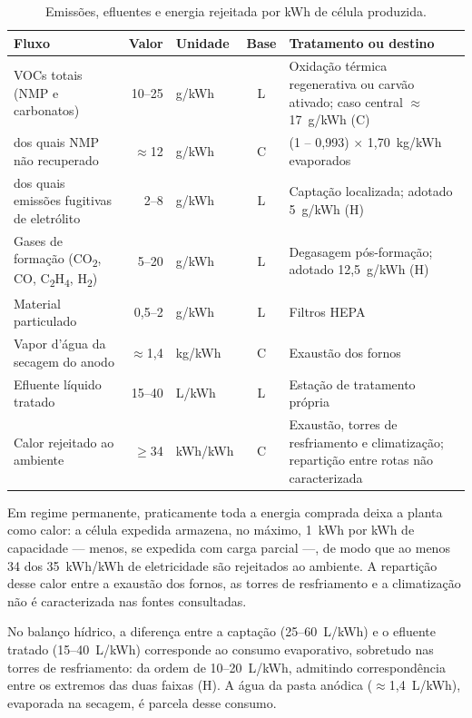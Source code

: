 \begin{table}[H]
\centering
\caption{Emissões, efluentes e energia rejeitada por kWh de célula produzida.}
\label{tab:giga-emissoes}
\small
\renewcommand{\arraystretch}{1.15}
\begin{tabularx}{\textwidth}{@{} >{\raggedright\arraybackslash}p{4.4cm} r l c X @{}}
\toprule
\textbf{Fluxo} & \textbf{Valor} & \textbf{Unidade} & \textbf{Base} & \textbf{Tratamento ou destino} \\
\midrule
VOCs totais (NMP e carbonatos) & 10--25 & g/kWh & L & Oxidação térmica regenerativa ou carvão ativado; caso central $\approx$17~g/kWh (C) \\
\quad dos quais NMP não recuperado & $\approx$12 & g/kWh & C & (1 -- 0,993) $\times$ 1,70~kg/kWh evaporados \\
\quad dos quais emissões fugitivas de eletrólito & 2--8 & g/kWh & L & Captação localizada; adotado 5~g/kWh (H) \\
Gases de formação (CO\textsubscript{2}, CO, C\textsubscript{2}H\textsubscript{4}, H\textsubscript{2}) & 5--20 & g/kWh & L & Degasagem pós-formação; adotado 12,5~g/kWh (H) \\
Material particulado & 0,5--2 & g/kWh & L & Filtros HEPA \\
Vapor d'água da secagem do anodo & $\approx$1,4 & kg/kWh & C & Exaustão dos fornos \\
Efluente líquido tratado & 15--40 & L/kWh & L & Estação de tratamento própria \\
Calor rejeitado ao ambiente & $\geq$34 & kWh/kWh & C & Exaustão, torres de resfriamento e climatização; repartição entre rotas não caracterizada \\
\bottomrule
\end{tabularx}
\end{table}

Em regime permanente, praticamente toda a energia comprada deixa a planta como
calor: a célula expedida armazena, no máximo, 1~kWh por kWh de capacidade —
menos, se expedida com carga parcial  —, de modo que ao menos 34 dos 35~kWh/kWh de eletricidade são
rejeitados ao ambiente. A repartição desse calor entre a exaustão dos fornos, as
torres de resfriamento e a climatização não é caracterizada nas fontes
consultadas.

No balanço hídrico, a diferença entre a captação (25--60~L/kWh) e o efluente
tratado (15--40~L/kWh) corresponde ao consumo evaporativo, sobretudo nas torres de
resfriamento: da ordem de 10--20~L/kWh, admitindo correspondência entre os
extremos das duas faixas (H). A água da pasta anódica ($\approx$1,4~L/kWh),
evaporada na secagem, é parcela desse consumo.

